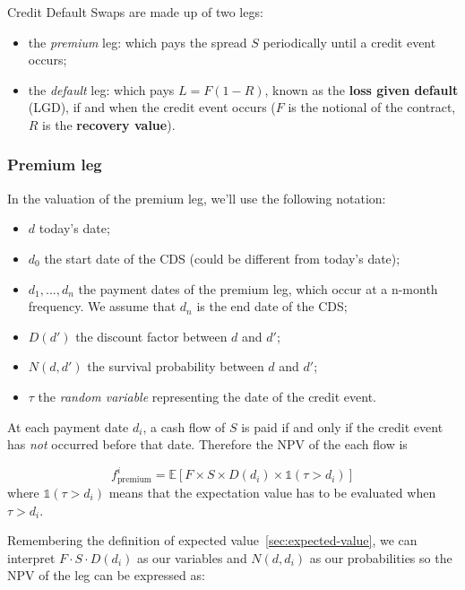 Credit Default Swaps are made up of two legs:

\begin{itemize}
\tightlist
\item
  the \emph{premium} leg: which pays the spread \(S\) periodically until a credit event occurs;
\item
  the \emph{default} leg: which pays \(L = F(1 - R)\), known as the
  \textbf{loss given default} (LGD), if and when the credit event occurs ($F$ is the notional of the contract, $R$ is the \textbf{recovery value}).
\end{itemize}

\subsubsection{Premium leg}\label{premium-leg}

In the valuation of the premium leg, we'll use the following notation:

\begin{itemize}
\tightlist
\item
  \(d\) today's date;
\item
  \(d_0\) the start date of the CDS (could be different from today's date);
\item
  \(d_1, ..., d_n\) the payment dates of the premium leg, which occur at
  a n-month frequency. We assume that \(d_n\) is the end date of the CDS;
\item
  \(D(d')\) the discount factor between \(d\) and \(d'\);
\item
  \(N(d, d')\) the survival probability between \(d\) and \(d'\);
\item
  \(\tau\) the \emph{random variable} representing the date of the credit event.
\end{itemize}

At each payment date \(d_i\), a cash flow of \(S\) is paid if and only if the
credit event has \emph{not} occurred before that date. Therefore the NPV of the
each flow is

\begin{equation}
f_{\textrm{premium}}^i = \mathbb{E}\left[F\times S \times D(d_i) \times \mathbb{1}(\tau > d_i) \right]
\end{equation}
where \(\mathbb{1}(\tau > d_i)\) means that the expectation value has to
be evaluated when \(\tau > d_i\). 

Remembering the definition of expected value~\ref{sec:expected-value}, we can interpret 
\(F\cdot S\cdot D(d_i)\) as our variables and \(N(d, d_i)\) as our probabilities so the NPV of the leg can be expressed as:

